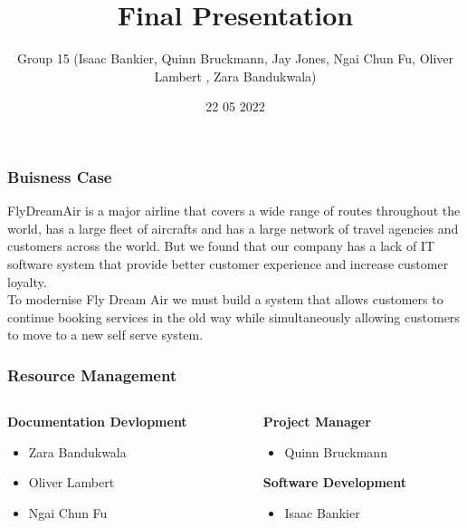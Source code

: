 \documentclass[12pt]{beamer}
\title{Final Presentation}
\author{Group 15 (Isaac Bankier, Quinn Bruckmann, Jay Jones, Ngai Chun Fu, Oliver Lambert , Zara Bandukwala)}
\date{22 05 2022}
\begin{document}
\begin{frame}
  \maketitle
\end{frame}

\begin{frame}[plain]
  \frametitle{Buisness Case}
  FlyDreamAir is a major airline that covers a wide range of routes throughout the world, has a large fleet of aircrafts and has a large network of travel agencies and customers across the world. But we found that our company has a lack of IT software system that provide better customer experience and increase customer loyalty.\\
  To modernise Fly Dream Air we must build a system that allows customers to continue booking services in the old way while simultaneously allowing customers to move to a new self serve system.
\end{frame}

\begin{frame}[plain]
  \frametitle{Resource Management}
  \begin{columns}
    \begin{column}{0.5\textwidth}
      \textbf{Documentation Devlopment}
      \begin{itemize}
      \item Zara Bandukwala​
      \item Oliver Lambert​
      \item Ngai Chun Fu
      \end{itemize}
    \end{column}
    \begin{column}{0.5\textwidth}
      \textbf{Project Manager}
      \begin{itemize}
      \item Quinn Bruckmann
      \end{itemize}
      \textbf{Software Development}
      \begin{itemize}
      \item Isaac Bankier
      \end{itemize}
    \end{column}
  \end{columns}
\end{frame}
\end{document}
